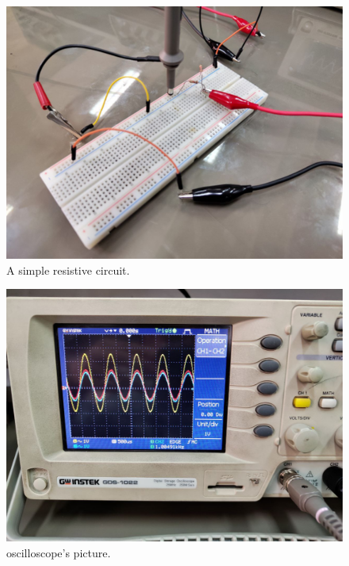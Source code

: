\documentclass[11pt]{article}
\newcommand{\PicScale}{0.2}
\begin{document}
\begin{question}
{        \begin{figure}[H]
            \begin{center}
                \includegraphics[scale=\PicScale]{Fig/30.jpeg}
                \caption{A simple resistive circuit.}
            \end{center}
        \end{figure}

        \begin{figure}[H]
            \begin{center}
                \includegraphics[scale=\PicScale]{Fig/31.jpeg}
                \caption{oscilloscope's picture.}
            \end{center}
        \end{figure}

}
\end{question}
\end{document}
